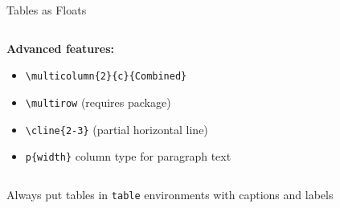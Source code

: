 \begin{frame}[fragile]{Tables as Floats}
\begin{columns}
\begin{column}{0.5\textwidth}
               \textbf{Advanced features:}
               \begin{itemize}
                    \item \texttt{\textbackslash multicolumn\{2\}\{c\}\{Combined\}}
                    \item \texttt{\textbackslash multirow} (requires package)
                    \item \texttt{\textbackslash cline\{2-3\}} (partial horizontal line)
                    \item \texttt{p\{width\}} column type for paragraph text
               \end{itemize}
          \end{column}
     \end{columns}
     
     \begin{tip}
          Always put tables in \texttt{table} environments with captions and labels
     \end{tip}
\end{frame}

